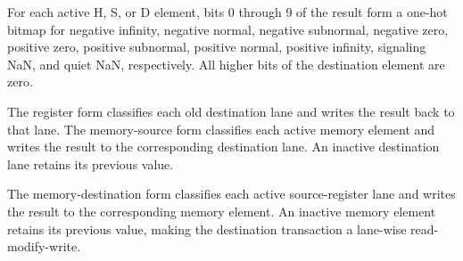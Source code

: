 For each active H, S, or D element, bits 0 through 9 of the result form a
one-hot bitmap for negative infinity, negative normal, negative subnormal,
negative zero, positive zero, positive subnormal, positive normal, positive
infinity, signaling NaN, and quiet NaN, respectively. All higher bits of the
destination element are zero.

The register form classifies each old destination lane and writes the result
back to that lane. The memory-source form classifies each active memory element
and writes the result to the corresponding destination lane. An inactive
destination lane retains its previous value.

The memory-destination form classifies each active source-register lane and
writes the result to the corresponding memory element. An inactive memory
element retains its previous value, making the destination transaction a
lane-wise read-modify-write.
